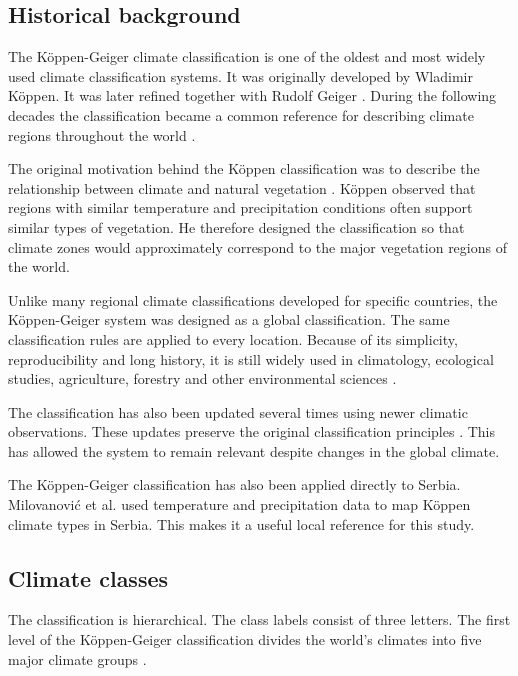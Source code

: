 \documentclass[11pt]{article}
\begin{document}
\subsection{Historical background}

The Köppen-Geiger climate classification is one of the oldest and most widely used climate classification systems. It was originally developed by Wladimir Köppen. It was later refined together with Rudolf Geiger \cite{koppen1936,peel2007}. During the following decades the classification became a common reference for describing climate regions throughout the world \cite{peel2007,beck2018}.

The original motivation behind the Köppen classification was to describe the relationship between climate and natural vegetation \cite{koppen1936,peel2007}. Köppen observed that regions with similar temperature and precipitation conditions often support similar types of vegetation. He therefore designed the classification so that climate zones would approximately correspond to the major vegetation regions of the world.

Unlike many regional climate classifications developed for specific countries, the Köppen-Geiger system was designed as a global classification. The same classification rules are applied to every location. Because of its simplicity, reproducibility and long history, it is still widely used in climatology, ecological studies, agriculture, forestry and other environmental sciences \cite{peel2007,beck2018}.

The classification has also been updated several times using newer climatic observations. These updates preserve the original classification principles \cite{peel2007,beck2018}. This has allowed the system to remain relevant despite changes in the global climate.

The Köppen-Geiger classification has also been applied directly to Serbia. Milovanović et al. \cite{milovanovic2017} used temperature and precipitation data to map Köppen climate types in Serbia. This makes it a useful local reference for this study.

\subsection{Climate classes}

The classification is hierarchical. The class labels consist of three letters. The first level of the Köppen-Geiger classification divides the world's climates into five major climate groups \cite{koppen1936,peel2007}.
\end{document}
